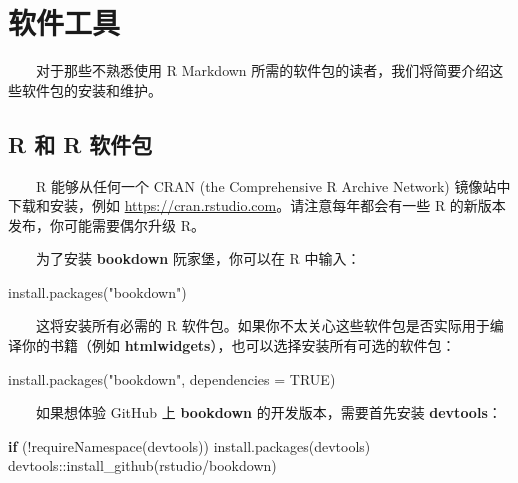 \documentclass[
  12pt,
]{krantz}
\newenvironment{Shaded}{\begin{snugshade}}{\end{snugshade}}
\newcommand{\AttributeTok}[1]{\textcolor[rgb]{0.77,0.63,0.00}{#1}}
\newcommand{\ConstantTok}[1]{\textcolor[rgb]{0.00,0.00,0.00}{#1}}
\newcommand{\ControlFlowTok}[1]{\textcolor[rgb]{0.13,0.29,0.53}{\textbf{#1}}}
\newcommand{\FunctionTok}[1]{\textcolor[rgb]{0.00,0.00,0.00}{#1}}
\newcommand{\NormalTok}[1]{#1}
\newcommand{\SpecialCharTok}[1]{\textcolor[rgb]{0.00,0.00,0.00}{#1}}
\newcommand{\StringTok}[1]{\textcolor[rgb]{0.31,0.60,0.02}{#1}}
\theoremstyle{definition}
\theoremstyle{definition}
\theoremstyle{definition}
\theoremstyle{definition}
\theoremstyle{remark}
\begin{document}
\cleardoublepage

\hypertarget{appendix-ux9644ux5f55}{%
\appendix {}}


\hypertarget{software-tools}{%
\chapter{软件工具}\label{software-tools}}

  对于那些不熟悉使用 R Markdown 所需的软件包的读者，我们将简要介绍这些软件包的安装和维护。

\hypertarget{r-ux548c-r-ux8f6fux4ef6ux5305}{%
\section{R 和 R 软件包}\label{r-ux548c-r-ux8f6fux4ef6ux5305}}

  R 能够从任何一个 CRAN (the Comprehensive R Archive Network) 镜像站中下载和安装，例如 \url{https://cran.rstudio.com}。请注意每年都会有一些 R 的新版本发布，你可能需要偶尔升级 R。

  为了安装 \textbf{bookdown} 阮家堡，你可以在 R 中输入：

\begin{Shaded}
\begin{Highlighting}[]
\FunctionTok{install.packages}\NormalTok{(}\StringTok{"bookdown"}\NormalTok{)}
\end{Highlighting}
\end{Shaded}

  这将安装所有必需的 R 软件包。如果你不太关心这些软件包是否实际用于编译你的书籍（例如 \textbf{htmlwidgets}），也可以选择安装所有可选的软件包：

\begin{Shaded}
\begin{Highlighting}[]
\FunctionTok{install.packages}\NormalTok{(}\StringTok{"bookdown"}\NormalTok{, }\AttributeTok{dependencies =} \ConstantTok{TRUE}\NormalTok{)}
\end{Highlighting}
\end{Shaded}

  如果想体验 GitHub 上 \textbf{bookdown} 的开发版本，需要首先安装 \textbf{devtools}：

\begin{Shaded}
\begin{Highlighting}[]
\ControlFlowTok{if}\NormalTok{ (}\SpecialCharTok{!}\FunctionTok{requireNamespace}\NormalTok{(}\StringTok{\textquotesingle{}devtools\textquotesingle{}}\NormalTok{)) }\FunctionTok{install.packages}\NormalTok{(}\StringTok{\textquotesingle{}devtools\textquotesingle{}}\NormalTok{)}
\NormalTok{devtools}\SpecialCharTok{::}\FunctionTok{install\_github}\NormalTok{(}\StringTok{\textquotesingle{}rstudio/bookdown\textquotesingle{}}\NormalTok{)}
\end{Highlighting}
\end{Shaded}
\end{document}
